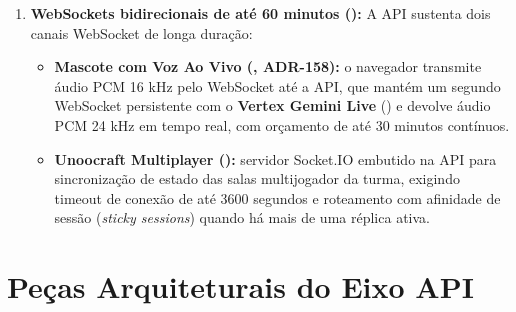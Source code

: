 \begin{enumerate}
  \item \textbf{WebSockets bidirecionais de até 60 minutos ():}
  A API sustenta dois canais WebSocket de longa duração:
  \begin{itemize}
    \item \textbf{Mascote com Voz Ao Vivo (, ADR-158):} o navegador transmite áudio PCM 16 kHz pelo WebSocket até a API, que mantém um segundo WebSocket persistente com o \textbf{Vertex Gemini Live} () e devolve áudio PCM 24 kHz em tempo real, com orçamento de até 30 minutos contínuos.
    \item \textbf{Unoocraft Multiplayer ():} servidor Socket.IO embutido na API para sincronização de estado das salas multijogador da turma, exigindo timeout de conexão de até 3600 segundos e roteamento com afinidade de sessão (\emph{sticky sessions}) quando há mais de uma réplica ativa.
  \end{itemize}
\end{enumerate}

\section{Peças Arquiteturais do Eixo API}
\label{sec:pecas-api}

